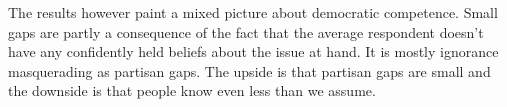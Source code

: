 \documentclass[12pt, letterpaper]{article}
\begin{document}
The results however paint a mixed picture about democratic competence. Small gaps are partly a consequence of the fact that the average respondent doesn't have any confidently held beliefs about the issue at hand. It is mostly ignorance masquerading as partisan gaps. The upside is that partisan gaps are small and the downside is that people know even less than we assume.

\clearpage



\clearpage


\end{document}
